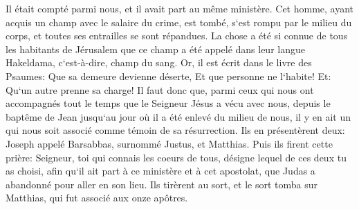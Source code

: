 \verse Il était compté parmi nous, et il avait part au même ministère. 
\verse Cet homme, ayant acquis un champ avec le salaire du crime, est tombé, s`est rompu par le milieu du corps, et toutes ses entrailles se sont répandues. 
\verse La chose a été si connue de tous les habitants de Jérusalem que ce champ a été appelé dans leur langue Hakeldama, c`est-à-dire, champ du sang. 
\verse Or, il est écrit dans le livre des Psaumes: Que sa demeure devienne déserte, Et que personne ne l`habite! Et: Qu`un autre prenne sa charge! 
\verse Il faut donc que, parmi ceux qui nous ont accompagnés tout le temps que le Seigneur Jésus a vécu avec nous, 
\verse depuis le baptême de Jean jusqu`au jour où il a été enlevé du milieu de nous, il y en ait un qui nous soit associé comme témoin de sa résurrection. 
\verse Ils en présentèrent deux: Joseph appelé Barsabbas, surnommé Justus, et Matthias. 
\verse Puis ils firent cette prière: Seigneur, toi qui connais les coeurs de tous, désigne lequel de ces deux tu as choisi, 
\verse afin qu`il ait part à ce ministère et à cet apostolat, que Judas a abandonné pour aller en son lieu. 
\verse Ils tirèrent au sort, et le sort tomba sur Matthias, qui fut associé aux onze apôtres. 

